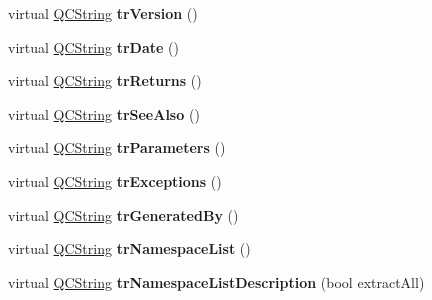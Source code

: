 \begin{DoxyCompactItemize}
\item 
\hypertarget{class_translator_swedish_a4c159562e29fe27461d720f6b85c6f7e}{virtual \hyperlink{class_q_c_string}{Q\-C\-String} {\bfseries tr\-Version} ()}\label{class_translator_swedish_a4c159562e29fe27461d720f6b85c6f7e}

\item 
\hypertarget{class_translator_swedish_a715c7be3c49c9d5aba58e4b64cc6c00b}{virtual \hyperlink{class_q_c_string}{Q\-C\-String} {\bfseries tr\-Date} ()}\label{class_translator_swedish_a715c7be3c49c9d5aba58e4b64cc6c00b}

\item 
\hypertarget{class_translator_swedish_ab5d8a97c3f20037cac764de958bd65e7}{virtual \hyperlink{class_q_c_string}{Q\-C\-String} {\bfseries tr\-Returns} ()}\label{class_translator_swedish_ab5d8a97c3f20037cac764de958bd65e7}

\item 
\hypertarget{class_translator_swedish_af0d165ede50aabbbdc9db316e370251f}{virtual \hyperlink{class_q_c_string}{Q\-C\-String} {\bfseries tr\-See\-Also} ()}\label{class_translator_swedish_af0d165ede50aabbbdc9db316e370251f}

\item 
\hypertarget{class_translator_swedish_a8955ee9ef9b45851d24617e2d5042038}{virtual \hyperlink{class_q_c_string}{Q\-C\-String} {\bfseries tr\-Parameters} ()}\label{class_translator_swedish_a8955ee9ef9b45851d24617e2d5042038}

\item 
\hypertarget{class_translator_swedish_a97ca33ee6650968ebd891277ee0575dc}{virtual \hyperlink{class_q_c_string}{Q\-C\-String} {\bfseries tr\-Exceptions} ()}\label{class_translator_swedish_a97ca33ee6650968ebd891277ee0575dc}

\item 
\hypertarget{class_translator_swedish_aa0426688896bb55b4980890f1cc6aa76}{virtual \hyperlink{class_q_c_string}{Q\-C\-String} {\bfseries tr\-Generated\-By} ()}\label{class_translator_swedish_aa0426688896bb55b4980890f1cc6aa76}

\item 
\hypertarget{class_translator_swedish_ae958060c87ca1439cfe719469641a0b8}{virtual \hyperlink{class_q_c_string}{Q\-C\-String} {\bfseries tr\-Namespace\-List} ()}\label{class_translator_swedish_ae958060c87ca1439cfe719469641a0b8}

\item 
\hypertarget{class_translator_swedish_aeb5226ccdd672b54940c1705029367da}{virtual \hyperlink{class_q_c_string}{Q\-C\-String} {\bfseries tr\-Namespace\-List\-Description} (bool extract\-All)}\label{class_translator_swedish_aeb5226ccdd672b54940c1705029367da}


\end{DoxyCompactItemize}
